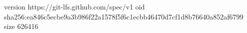 version https://git-lfs.github.com/spec/v1
oid sha256:ea846c5ecbe9a3b986f22a1578f5f6c1ecbb46470d7cf1d8b76640a852af6799
size 626416
